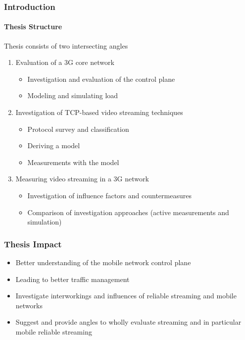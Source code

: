\documentclass{beamer}
\begin{document}
\begin{frame}
	\frametitle{Introduction}
	\framesubtitle{Thesis Structure}

	Thesis consists of two intersecting angles
	\begin{enumerate}
		\item Evaluation of a 3G core network
			\begin{itemize}
				\item Investigation and evaluation of the control plane
				\item Modeling and simulating load
			\end{itemize}

		\item Investigation of TCP-based video streaming techniques
			\begin{itemize}
				\item Protocol survey and classification
				\item Deriving a model
				\item Measurements with the model
			\end{itemize}

		\item Measuring video streaming in a 3G network 
			\begin{itemize}
				\item Investigation of influence factors and countermeasures
				\item Comparison of investigation approaches (active measurements and simulation)
			\end{itemize}
	\end{enumerate}


\end{frame}


\begin{frame}
	\frametitle{Thesis Impact}

	\begin{itemize}
		\item Better understanding of the mobile network control plane
		\item Leading to better traffic management
		\item Investigate interworkings and influences of reliable streaming and mobile networks
		\item Suggest and provide angles to wholly evaluate streaming and in particular mobile reliable streaming
	\end{itemize}
\end{frame}
\end{document}
